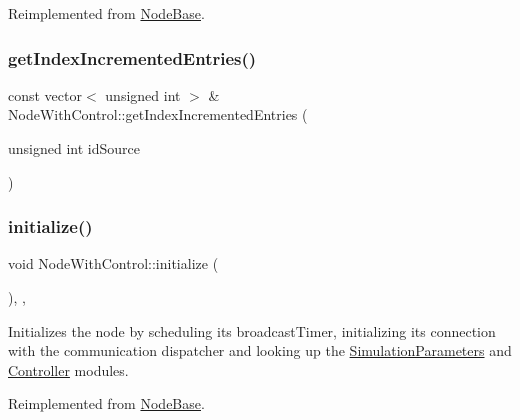 Reimplemented from \hyperlink{class_node_base_a49052382add1123da26db6bfb687d254}{Node\+Base}.

\mbox{\label{class_node_with_control_acf1daba46cfa16eb2bd7cbd399c2624b}} 
\subsubsection{\texorpdfstring{get\+Index\+Incremented\+Entries()}{getIndexIncrementedEntries()}}
{\footnotesize\ttfamily const vector$<$ unsigned int $>$ \& Node\+With\+Control\+::get\+Index\+Incremented\+Entries (\begin{DoxyParamCaption}\item[{unsigned int}]{id\+Source }\end{DoxyParamCaption})\hspace{0.3cm}{\ttfamily [protected]}}

\mbox{\label{class_node_with_control_a08c8e80fd67b52c51c642d7c66fe729c}} 
\subsubsection{\texorpdfstring{initialize()}{initialize()}}
{\footnotesize\ttfamily void Node\+With\+Control\+::initialize (\begin{DoxyParamCaption}{ }\end{DoxyParamCaption})\hspace{0.3cm}{\ttfamily [override]}, {\ttfamily [protected]}, {\ttfamily [virtual]}}



Initializes the node by scheduling it\textquotesingle{}s broadcast\+Timer, initializing its connection with the communication dispatcher and looking up the \hyperlink{class_simulation_parameters}{Simulation\+Parameters} and \hyperlink{class_controller}{Controller} modules. 



Reimplemented from \hyperlink{class_node_base_af7910c39553111295b66c88742d1198a}{Node\+Base}.



